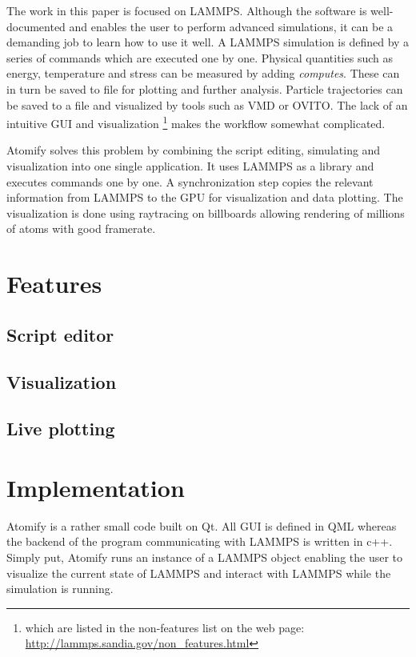 \documentclass[aps,pre,twocolumn,letterpaper,floatfix]{revtex4}
\begin{document}
The work in this paper is focused on LAMMPS. Although the software is well-documented and enables the user to perform advanced simulations, it can be a demanding job to learn how to use it well. A LAMMPS simulation is defined by a series of commands which are executed one by one. Physical quantities such as energy, temperature and stress can be measured by adding \textit{computes}. These can in turn be saved to file for plotting and further analysis. Particle trajectories can be saved to a file and visualized by tools such as VMD\cite{Humphrey1996Vmd} or OVITO\cite{Stukowski2009Visualization}. The lack of an intuitive GUI and visualization \footnote{which are listed in the non-features list on the web page: \url{http://lammps.sandia.gov/non_features.html}} makes the workflow somewhat complicated. 

Atomify solves this problem by combining the script editing, simulating and visualization into one single application. It uses LAMMPS as a library and executes commands one by one. A synchronization step copies the relevant information from LAMMPS to the GPU for visualization and data plotting. The visualization is done using raytracing on billboards allowing rendering of millions of atoms with good framerate. 

\section{Features}

\subsection{Script editor}
\subsection{Visualization}
\subsection{Live plotting}

\section{Implementation}
Atomify is a rather small code built on Qt. All GUI is defined in QML whereas the backend of the program communicating with LAMMPS is written in c++. Simply put, Atomify runs an instance of a LAMMPS object enabling the user to visualize the current state of LAMMPS and interact with LAMMPS while the simulation is running. 
\end{document}
